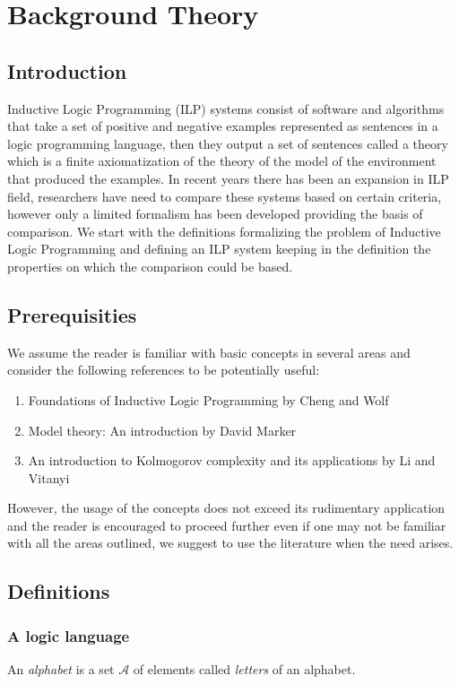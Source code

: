
\chapter{Background Theory}


\section{Introduction}
Inductive Logic Programming (ILP) systems consist of software and algorithms that take a set of positive and negative examples represented as sentences in a logic programming language, then they output a set of sentences called a theory which is a finite axiomatization of the theory of the model of the environment that produced the examples. In recent years there has been an expansion in ILP field, researchers have need to compare these systems based on certain criteria, however only a limited formalism has been developed providing the basis of comparison.
We start with the definitions formalizing the problem of Inductive Logic Programming and defining an ILP system keeping in the definition the properties on which the comparison could be based.

\section{Prerequisities}
We assume the reader is familiar with basic concepts in several areas and consider the following references to be potentially useful:
\begin{enumerate}
\item Foundations of Inductive Logic Programming by Cheng and Wolf \cite{cheng1997}
\item Model theory: An introduction by David Marker \cite{marker2002}
\item An introduction to Kolmogorov complexity and its applications by Li and Vitanyi \cite{li1997}
\end{enumerate}
However, the usage of the concepts does not exceed its rudimentary application and the reader is encouraged to proceed further even if one may not be familiar with all the areas outlined, we suggest to use the literature when the need arises.
\section{Definitions}

\subsection{A logic language}
\begin{defn}
An \emph{alphabet} is a set $\mathcal{A}$ of elements called \emph{letters} of an alphabet.
\end{defn}


